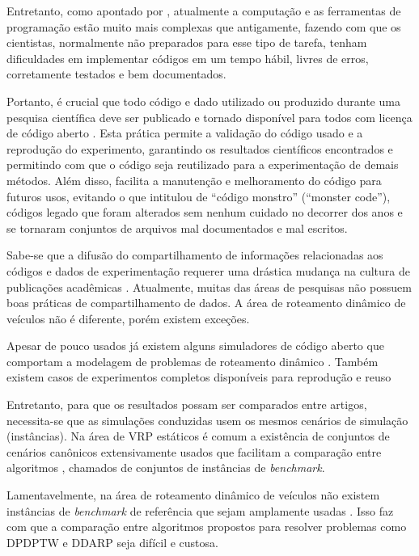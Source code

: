 Entretanto, como apontado por \textcite{merali_computational_2010}, atualmente
a computação e as ferramentas de programação estão muito mais complexas que 
antigamente, fazendo com que os cientistas, normalmente não preparados para 
esse tipo de tarefa, tenham dificuldades em implementar códigos em um tempo 
hábil, livres de erros, corretamente testados e bem documentados.

Portanto, é crucial que todo código e dado utilizado ou produzido durante uma
pesquisa científica deve ser publicado e tornado disponível para todos com
licença de código aberto \cite{ince_case_2012}.
Esta prática permite a validação do código usado e a reprodução do experimento,
garantindo os resultados científicos encontrados e permitindo com que o
código seja reutilizado para a experimentação de demais métodos.
Além disso, facilita a manutenção e melhoramento do código para futuros usos,
evitando o que \textcite{merali_computational_2010} intitulou de ``código
monstro'' (``monster code''), códigos legado que foram alterados sem nenhum
cuidado no decorrer dos anos e se tornaram conjuntos de arquivos mal 
documentados e mal escritos.

Sabe-se que a difusão do compartilhamento de informações relacionadas aos
códigos e dados de experimentação requerer uma drástica mudança na cultura de 
publicações acadêmicas \cite{leveque_reproducible_2012}.
Atualmente, muitas das áreas de pesquisas não possuem boas práticas de 
compartilhamento de dados. 
A área de roteamento dinâmico de veículos não é diferente, porém existem
exceções.

Apesar de pouco usados já existem alguns simuladores de código aberto que 
comportam a modelagem de problemas de roteamento dinâmico 
\cite{maciejewski_towards_2017, van_lon_rinsim:_2012, mayer_open-source_2016}.
Também existem casos de experimentos completos disponíveis para reprodução e
reuso \cite{van_lon_when_2017, van_lon_towards_2015, van_lon_measures_2016}

Entretanto, para que os resultados possam ser comparados entre artigos, 
necessita-se que as simulações conduzidas usem os mesmos cenários de 
simulação (instâncias).
Na área de VRP estáticos é comum a existência de conjuntos de cenários
canônicos extensivamente usados que facilitam a comparação entre 
algoritmos \cite{mendoza_vrp-rep:_2014}, chamados de
conjuntos de instâncias de \textit{benchmark}.

Lamentavelmente, na área de roteamento dinâmico de veículos não existem 
instâncias de \textit{benchmark} de referência que sejam amplamente usadas 
\cite{pillac_review_2013, maciejewski_towards_2017}. 
Isso faz com que a comparação entre algoritmos
propostos para resolver problemas como DPDPTW e DDARP seja difícil e custosa.

